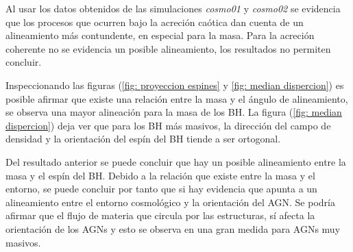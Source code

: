 Al usar los datos obtenidos de las simulaciones {\it{cosmo01}} y {\it{cosmo02}} se evidencia que los procesos que ocurren bajo la acreción caótica dan cuenta de un alineamiento más contundente, en especial para la masa. Para la acreción coherente no se evidencia un posible alineamiento, los resultados no permiten concluir. 

Inspeccionando las figuras (\ref{fig: proyeccion espines} y \ref{fig: median dispercion}) es posible afirmar que existe una relación entre la masa y el ángulo de alineamiento, se observa una mayor alineación para la masa de los BH. La figura (\ref{fig: median dispercion}) deja ver que para los BH más masivos, la dirección del campo de densidad y la orientación del espín del BH tiende a ser ortogonal. 

Del resultado anterior se puede concluir que hay un posible alineamiento entre la masa y el espín del BH. Debido a la relación que existe entre la masa y el entorno, se puede concluir por tanto que si hay evidencia que apunta a un alineamiento entre el entorno cosmológico y la orientación del AGN. Se podría afirmar que el flujo de materia que circula por las estructuras, sí afecta la orientación de los AGNs y esto se observa en una gran medida para AGNs muy masivos.





